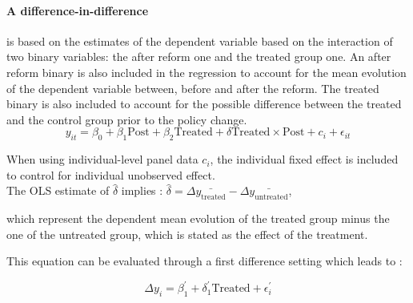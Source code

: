 




\paragraph{A difference-in-difference} is based on the estimates of the dependent variable based on the interaction of two binary variables: the after reform one and the treated group one. An after reform binary is also included in the regression to account for the mean evolution of the dependent variable between,  before and after the reform. The treated binary is also included to account for the possible difference between the treated and the control group prior to the policy change.
  \begin{equation}
  y_{it} = \beta_0 + \beta_1 \text{Post}  + \beta_2 \text{Treated}  +  \delta  \text{Treated} \times \text{Post}  + c_i + \epsilon_{it}
  \end{equation}

  When using individual-level panel data $c_i$, the individual fixed effect is included to control for individual unobserved effect.\\
  The OLS estimate of $\hat{\delta}$ implies : 
  $\hat{\delta} = \Delta \bar{y_{\text{treated}}} - \Delta \bar{y_{\text{untreated}}} $,

  which represent the dependent mean evolution of the treated group minus the one of the untreated group, which is stated as the effect of the treatment.

  This equation can be evaluated through a first difference setting which leads to : 

  \begin{equation}
  \Delta y_{i} =   \beta^{'}_1+ \delta_1^{'}  \text{Treated} + \epsilon^{'}_{i}
  \end{equation}

